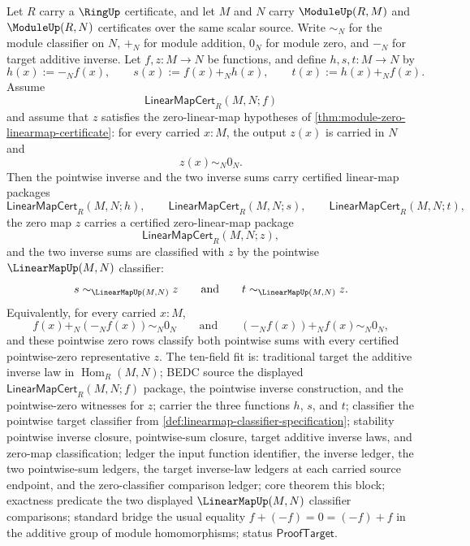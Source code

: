 \begin{theorem}
\label{thm:module-linearmap-pointwise-inverse-sum-zero-classifier}
Let $R$ carry a $\RingUp$ certificate, and let $M$ and $N$ carry $\ModuleUp(R,M)$ and $\ModuleUp(R,N)$ certificates over the same scalar source. Write $\sim_N$ for the module classifier on $N$, $+_N$ for module addition, $0_N$ for module zero, and $-_N$ for target additive inverse. Let $f,z:M\to N$ be functions, and define $h,s,t:M\to N$ by
$$
h(x):=-_N f(x),
\qquad
s(x):=f(x)+_N h(x),
\qquad
t(x):=h(x)+_N f(x).
$$
Assume
$$
\mathsf{LinearMapCert}_R(M,N;f)
$$
and assume that $z$ satisfies the zero-linear-map hypotheses of \autoref{thm:module-zero-linearmap-certificate}: for every carried $x:M$, the output $z(x)$ is carried in $N$ and
$$
z(x)\sim_N0_N.
$$
Then the pointwise inverse and the two inverse sums carry certified linear-map packages
$$
\mathsf{LinearMapCert}_R(M,N;h),
\qquad
\mathsf{LinearMapCert}_R(M,N;s),
\qquad
\mathsf{LinearMapCert}_R(M,N;t),
$$
the zero map $z$ carries a certified zero-linear-map package
$$
\mathsf{LinearMapCert}_R(M,N;z),
$$
and the two inverse sums are classified with $z$ by the pointwise $\LinearMapUp(M,N)$ classifier:
$$
s\sim_{\LinearMapUp(M,N)}z
\qquad\text{and}\qquad
t\sim_{\LinearMapUp(M,N)}z.
$$
Equivalently, for every carried $x:M$,
$$
f(x)+_N(-_N f(x))\sim_N0_N
\qquad\text{and}\qquad
(-_N f(x))+_Nf(x)\sim_N0_N,
$$
and these pointwise zero rows classify both pointwise sums with every certified pointwise-zero representative $z$.
The ten-field fit is: traditional target the additive inverse law in $\operatorname{Hom}_R(M,N)$; BEDC source the displayed $\mathsf{LinearMapCert}_R(M,N;f)$ package, the pointwise inverse construction, and the pointwise-zero witnesses for $z$; carrier the three functions $h$, $s$, and $t$; classifier the pointwise target classifier from \autoref{def:linearmap-classifier-specification}; stability pointwise inverse closure, pointwise-sum closure, target additive inverse laws, and zero-map classification; ledger the input function identifier, the inverse ledger, the two pointwise-sum ledgers, the target inverse-law ledgers at each carried source endpoint, and the zero-classifier comparison ledger; core theorem this block; exactness predicate the two displayed $\LinearMapUp(M,N)$ classifier comparisons; standard bridge the usual equality $f+(-f)=0=(-f)+f$ in the additive group of module homomorphisms; status $\mathsf{ProofTarget}$.
\end{theorem}
